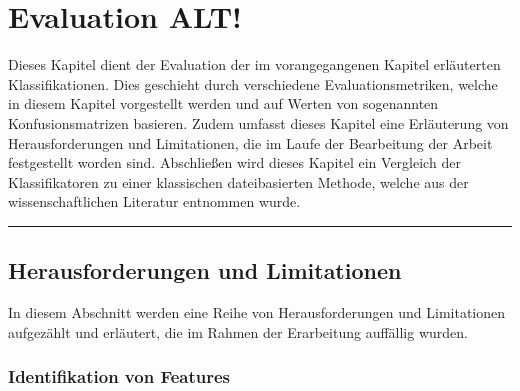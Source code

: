
\chapter{Evaluation ALT!}
\label{evaluation}

Dieses Kapitel dient der Evaluation der im vorangegangenen Kapitel erläuterten Klassifikationen. Dies geschieht durch verschiedene Evaluationsmetriken, welche in diesem Kapitel vorgestellt werden und auf Werten von sogenannten Konfusionsmatrizen basieren. Zudem umfasst dieses Kapitel eine Erläuterung von Herausforderungen und Limitationen, die im Laufe der Bearbeitung der Arbeit festgestellt worden sind. Abschließen wird dieses Kapitel ein Vergleich der Klassifikatoren zu einer klassischen dateibasierten Methode, welche aus der wissenschaftlichen Literatur entnommen wurde.
\\
\hrule

\section{Herausforderungen und Limitationen}

In diesem Abschnitt werden eine Reihe von Herausforderungen und Limitationen aufgezählt und erläutert, die im Rahmen der Erarbeitung auffällig wurden.

\subsection*{Identifikation von Features}

